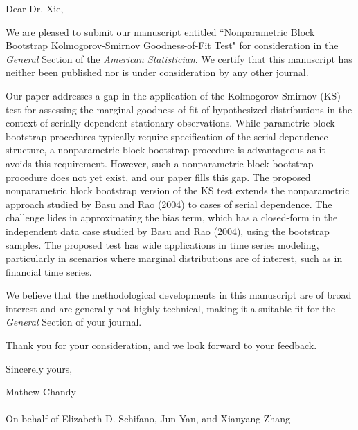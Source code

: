 \documentclass[12pt]{article}
\begin{document}

\bigskip

Dear Dr. Xie,

We are pleased to submit our manuscript entitled 
``Nonparametric Block Bootstrap Kolmogorov-Smirnov Goodness-of-Fit
Test"  for consideration in the \emph{General} Section of the
\textit{American Statistician}. We certify that this manuscript has
neither been published nor is under consideration by any other
journal.


Our paper addresses a gap in the application of the Kolmogorov-Smirnov
(KS) test for assessing the marginal goodness-of-fit of hypothesized
distributions in the context of serially dependent stationary
observations. While parametric block bootstrap procedures typically
require specification of the serial dependence structure, a
nonparametric block bootstrap procedure is advantageous as it avoids
this requirement. However, such a nonparametric block bootstrap procedure does 
not yet exist, and our paper fills this gap. The proposed nonparametric block 
bootstrap version of the KS test extends the nonparametric approach studied by 
Basu and Rao (2004) to cases of serial dependence. The challenge lides
in approximating the bias term, which has a closed-form in the
independent data case studied by Basu and Rao (2004), using the
bootstrap samples. The proposed test has wide
applications in time series modeling, particularly in scenarios where
marginal distributions are of interest, such as in financial time series.


We believe that the methodological developments in this manuscript are
of broad interest and are generally not highly technical, making it a
suitable fit for the \emph{General} Section of your journal.


Thank you for your consideration, and we look forward to your feedback.


\bigskip

Sincerely yours,

\vspace{2cm}

Mathew Chandy\\ \\On behalf of Elizabeth D. Schifano, Jun Yan, and 
Xianyang Zhang
\end{document}
